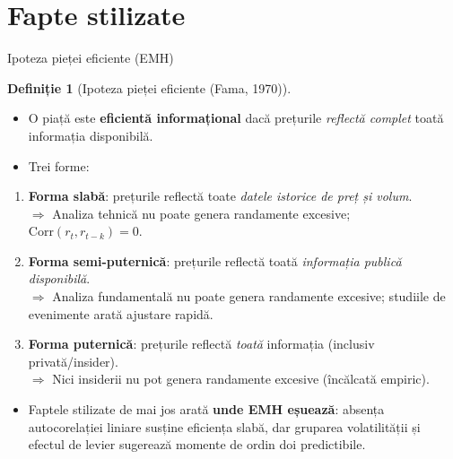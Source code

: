 \documentclass[9pt, aspectratio=169, t]{beamer}
\theoremstyle{definition}
\newtheorem{defn}{Definiție}
\newcommand{\Corr}{\text{Corr}}
\begin{document}
\section{Fapte stilizate}

\begin{frame}{Ipoteza pieței eficiente (EMH)}
\begin{defn}[Ipoteza pieței eficiente (Fama, 1970)]
\begin{itemize}\setlength{\itemsep}{1pt}
    \item O piață este \textbf{eficientă informațional} dacă prețurile \textit{reflectă complet} toată informația disponibilă.
    \item Trei forme:
\end{itemize}
\end{defn}
\vspace{0.1cm}
\begin{enumerate}
    \item \textbf{Forma slabă}: prețurile reflectă toate \textit{datele istorice de preț și volum}.\\
    $\Rightarrow$ Analiza tehnică nu poate genera randamente excesive; $\Corr(r_t, r_{t-k}) = 0$.
    \item \textbf{Forma semi-puternică}: prețurile reflectă toată \textit{informația publică disponibilă}.\\
    $\Rightarrow$ Analiza fundamentală nu poate genera randamente excesive; studiile de evenimente arată ajustare rapidă.
    \item \textbf{Forma puternică}: prețurile reflectă \textit{toată} informația (inclusiv privată/insider).\\
    $\Rightarrow$ Nici insiderii nu pot genera randamente excesive (încălcată empiric).
\end{enumerate}
\vspace{0.1cm}
\begin{itemize}
    \item Faptele stilizate de mai jos arată \textbf{unde EMH eșuează}: absența autocorelației liniare susține eficiența slabă, dar gruparea volatilității și efectul de levier sugerează momente de ordin doi predictibile.
\end{itemize}
\end{frame}
\end{document}
